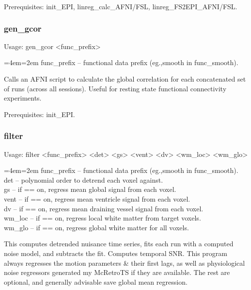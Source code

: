 \documentclass[final,titlepage,letterpaper,oneside,12pt]{article}
\renewcommand{\texttt}[2][BrickRed]{\textcolor{#1}{\ttfamily #2}}%
\newenvironment{blockquote}{%
  \par%
  \medskip
  \leftskip=4em\rightskip=2em%
  \noindent\ignorespaces}{%
  \par\medskip}
\begin{document}
Prerequisites: \texttt{init\_EPI}, \texttt{linreg\_calc\_AFNI/FSL}, \texttt{linreg\_FS2EPI\_AFNI/FSL}.

\subsubsection{gen\_gcor}
Usage: \texttt{gen\_gcor <func\_prefix>}

\begin{blockquote}
func\_prefix -- functional data prefix (eg.,smooth in func\_smooth).
\end{blockquote}

\noindent Calls an AFNI script to calculate the global correlation for each concatenated set of runs (across all sessions). Useful for resting state functional connectivity experiments.

Prerequisites: \texttt{init\_EPI}.

\subsubsection{filter}
Usage: \texttt{filter <func\_prefix> <det> <gs> <vent> <dv> <wm\_loc> <wm\_glo>}

\begin{blockquote}
func\_prefix -- functional data prefix (eg.,smooth in func\_smooth). \\
det -- polynomial order to detrend each voxel against. \\
gs -- if == on, regress mean global signal from each voxel. \\
vent -- if == on, regress mean ventricle signal from each voxel. \\
dv -- if == on, regress mean draining vessel signal from each voxel. \\
wm\_loc -- if == on, regress local white matter from target voxels. \\
wm\_glo -- if == on, regress global white matter for all voxels. \

\end{blockquote}

\noindent This computes detrended nuisance time series, fits each run with a computed noise model, and subtracts the fit. Computes temporal SNR. This program always regresses the motion parameters \& their first lags, as well as physiological noise regressors generated my McRetroTS if they are available. The rest are optional, and generally advisable save global mean regression.
\end{document}
